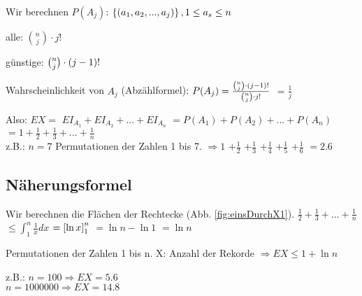 Wir berechnen $P(A_j)$: 
$ \left\lbrace  \left( a_1,a_2,...,a_j \right)  \right\rbrace , 1 \leq a_s \leq n $ 

alle: $\binom n j \cdot j!$

günstige: $\binom n j \cdot  \left( j-1 \right) !$

Wahrscheinlichkeit von $A_j$ (Abzählformel): $ P(A_j) = \frac{\binom n j \cdot  \left( j-1 \right) !}{\binom n j \cdot j!}$
$= \frac{1}{j}$

Also: $ E X = $
$E I_{A_1} + E I_{A_2} + ... + E I_{A_n}$
$= P(A_1) + P(A_2) + ... + P(A_n)$
$= 1 + \frac{1}{2} + \frac{1}{3} + ... + \frac{1}{n} $\\


z.B.: $n=7$ Permutationen der Zahlen 1 bis 7. 
$\Rightarrow 1$
$+ \frac{1}{2}$
$+ \frac{1}{3}$ 
$+ \frac{1}{4}$ 
$+ \frac{1}{5}$ 
$+ \frac{1}{6}$
$=2.6$

\subsection{Näherungsformel}
Wir berechnen die Flächen der Rechtecke (Abb. \ref{fig:einsDurchX1}). 
$ \frac{1}{2} + \frac{1}{3} + ... + \frac{1}{n} $
$ \leq \int_{1}^{n} \frac{1}{x} dx $ 
$ =  \left[ \ln x \right] _1^n $ 
$ = \ln n - \ln 1 $
$ = \ln n $

Permutationen der Zahlen 1 bis n. X: Anzahl der Rekorde 
$\Rightarrow E X \leq 1 + \ln n $

z.B.: $n=100 \Rightarrow E X = 5.6$\\
$n=1 000 000\Rightarrow E X = 14.8$
